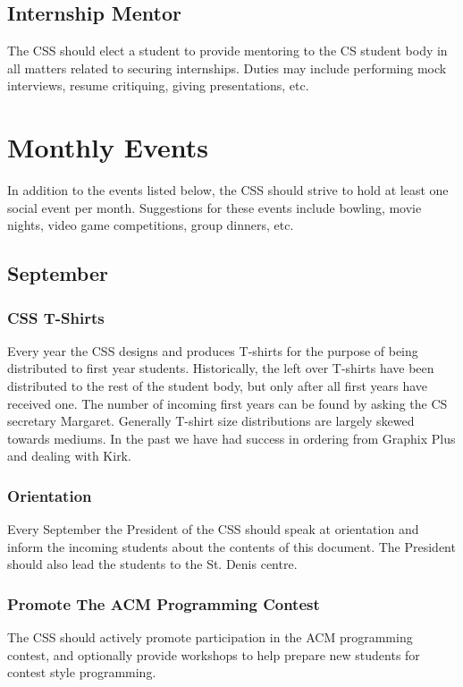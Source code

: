 \documentclass[12pt]{article}
\begin{document}
\subsection{Internship Mentor}
The CSS should elect a student to provide mentoring to the CS student body in
all matters related to securing internships.  Duties may include performing
mock interviews, resume critiquing, giving presentations, etc.

\section{Monthly Events}
In addition to the events listed below, the CSS should strive to hold at least
one social event per month.  Suggestions for these events include bowling, movie
nights, video game competitions, group dinners, etc.

\subsection{September}

\subsubsection{CSS T-Shirts}
Every year the CSS designs and produces T-shirts for the purpose of being
distributed to first year students.  Historically, the left over T-shirts have
been distributed to the rest of the student body, but only after all first years
have received one.  The number of incoming first years can be found by asking
the CS secretary Margaret.  Generally T-shirt size distributions are largely
skewed towards mediums. In the past we have had success in ordering from
Graphix Plus and dealing with Kirk.

\subsubsection{Orientation}
Every September the President of the CSS should speak at orientation and inform
the incoming students about the contents of this document.  The President should
also lead the students to the St. Denis centre.

\subsubsection{Promote The ACM Programming Contest}
The CSS should actively promote participation in the ACM programming contest,
and optionally provide workshops to help prepare new students for contest style
programming.
\end{document}
